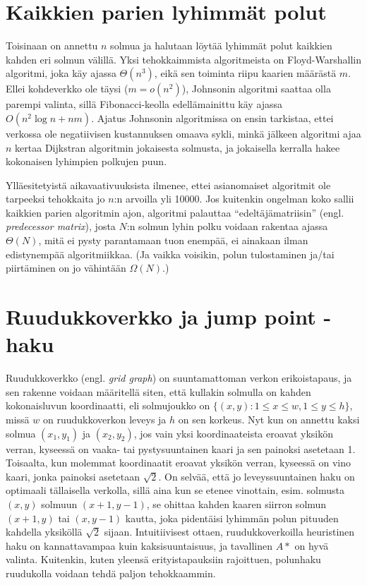 \documentclass[finnish]{tktltiki2}
\theoremstyle{definition}
\theoremstyle{remark}
\begin{document}
\section{Kaikkien parien lyhimmät polut}
Toisinaan on annettu $n$ solmua ja halutaan löytää lyhimmät polut kaikkien kahden eri solmun välillä. Yksi tehokkaimmista algoritmeista on Floyd-Warshallin algoritmi, joka käy ajassa $\Theta(n^3)$, eikä sen toiminta riipu kaarien määrästä $m$. Ellei kohdeverkko ole täysi ($m = o(n^2)$), Johnsonin algoritmi saattaa olla parempi valinta, sillä Fibonacci-keolla edellämainittu käy ajassa $O(n^2 \log n + nm)$. Ajatus Johnsonin algoritmissa on ensin tarkistaa, ettei verkossa ole negatiivisen kustannuksen omaava sykli, minkä jälkeen algoritmi ajaa $n$ kertaa Dijkstran algoritmin jokaisesta solmusta, ja jokaisella kerralla hakee kokonaisen lyhimpien polkujen puun. 

Ylläesitetyistä aikavaativuuksista ilmenee, ettei asianomaiset algoritmit ole tarpeeksi tehokkaita jo $n$:n arvoilla yli 10000. Jos kuitenkin ongelman koko sallii kaikkien parien algoritmin ajon, algoritmi palauttaa ``edeltäjämatriisin'' (engl. \textit{predecessor matrix}), josta $N$:n solmun lyhin polku voidaan rakentaa ajassa $\Theta(N)$, mitä ei pysty parantamaan tuon enempää, ei ainakaan ilman edistynempää algoritmiikkaa. (Ja vaikka voisikin, polun tulostaminen ja/tai piirtäminen on jo vähintään $\Omega(N)$.)

\section{Ruudukkoverkko ja jump point -haku}
Ruudukkoverkko (engl. \textit{grid graph}) on suuntamattoman verkon erikoistapaus, ja sen rakenne voidaan määritellä siten, että kullakin solmulla on kahden kokonaisluvun koordinaatti, eli solmujoukko on $\{ (x, y) \colon 1 \leq x \leq w, 1 \leq y \leq h \}$, missä $w$ on ruudukkoverkon leveys ja $h$ on sen korkeus. Nyt kun on annettu kaksi solmua $(x_1, y_1)$ ja $(x_2, y_2)$, jos vain yksi koordinaateista eroavat yksikön verran, kyseessä on vaaka- tai pystysuuntainen kaari ja sen painoksi asetetaan 1. Toisaalta, kun molemmat koordinaatit eroavat yksikön verran, kyseessä on vino kaari, jonka painoksi asetetaan $\sqrt{2}$. On selvää, että jo leveyssuuntainen haku on optimaali tällaisella verkolla, sillä aina kun se etenee vinottain, esim. solmusta $(x, y)$ solmuun $(x + 1, y - 1)$, se ohittaa kahden kaaren siirron solmun $(x + 1, y)$ tai $(x, y - 1)$ kautta, joka pidentäisi lyhimmän polun pituuden kahdella yksiköllä $\sqrt{2}$ sijaan.
Intuitiivisest ottaen, ruudukkoverkoilla heuristinen haku on kannattavampaa kuin kaksisuuntaisuus, ja tavallinen $A\ast$ on hyvä valinta. Kuitenkin, kuten yleensä erityistapauksiin rajoittuen, polunhaku ruudukolla voidaan tehdä paljon tehokkaammin. 
\end{document}
